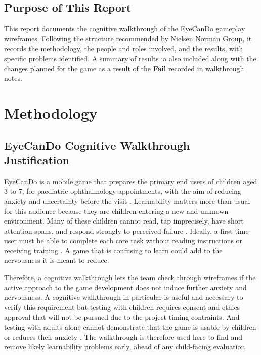 \documentclass{article}
\newcommand{\fail}{{\textbf{Fail}}}
\begin{document}
\subsection{Purpose of This Report}

This report documents the cognitive walkthrough of the EyeCanDo gameplay wireframes. Following 
the structure recommended by Nielsen Norman Group, it records the methodology, the people and 
roles involved, and the results, with specific problems identified. A summary of results ia also 
included along with the changes planned for the game as a result of the \fail{} recorded in 
walkthrough notes\cite{nng-overview}.

\section{Methodology}

\subsection{EyeCanDo Cognitive Walkthrough Justification}

EyeCanDo is a mobile game that prepares the primary end users of children aged 3 to 7, for 
paediatric ophthalmology appointments, with the aim of reducing anxiety and uncertainty 
before the visit \cite{srs}. Learnability matters more than usual for this audience because 
they are children entering a new and unknown environment. Many of these children cannot read, 
tap imprecisely, have short attention spans, and respond strongly to perceived failure \cite{srs}. 
Ideally, a first-time user must be able to complete each core task without reading instructions 
or receiving training \cite{srs}. A game that is confusing to learn could add to the nervousness 
it is meant to reduce.

Therefore, a cognitive walkthrough lets the team check through wireframes if the active approach 
to the game development does not induce further anxiety and nervousness. A cognitive walkthrough 
in particular is useful and necessary to verify this requirement but testing with children requires 
consent and ethics approval that will not be pursued due to the project timing contraints. And testing 
with adults alone cannot demonstrate that the game is usable by children or reduces their anxiety 
\cite{srs}. The walkthrough is therefore used here to find and remove likely learnability problems 
early, ahead of any child-facing evaluation.
\end{document}
